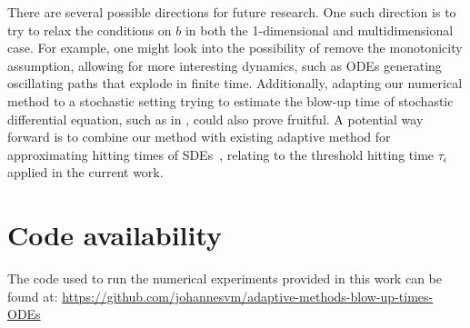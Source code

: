 \documentclass[a4paper, oneside, reqno]{amsart}
\theoremstyle{remark}
\begin{document}
There are several possible directions for future research. 
One such direction is to try to relax the conditions on \(b\) in both the 1-dimensional and multidimensional case.
For example, one might look into the possibility of remove the monotonicity assumption, allowing for more interesting dynamics, such as ODEs generating oscillating paths that explode in finite time. 
Additionally, adapting our numerical method to a stochastic setting trying to estimate the blow-up time of stochastic differential equation, such as in \cite{Dávila2005}, could also prove fruitful. A potential way forward is to combine our method with existing adaptive method for approximating hitting times of SDEs~\cite{Hoel2025}, relating to the threshold hitting time $\tau_\epsilon$ applied in the current work.  

\section*{Code availability}
The code used to run the numerical experiments provided in this work can be found at: \href{https://github.com/johannesvm/adaptive-methods-blow-up-times-ODEs}{https://github.com/johannesvm/adaptive-methods-blow-up-times-ODEs}



\end{document}
